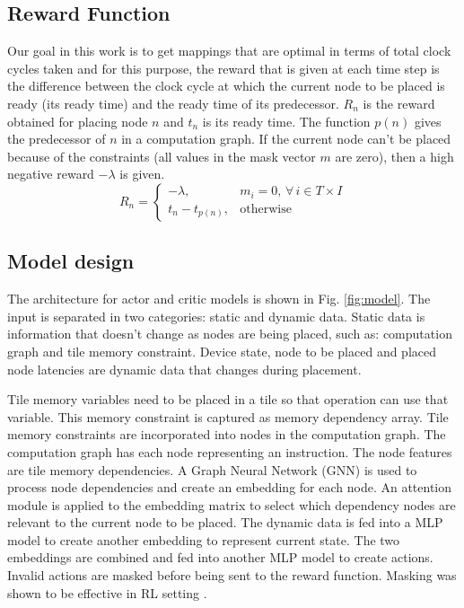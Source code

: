 \subsection{Reward Function}
Our goal in this work is to get mappings that are optimal in terms of total clock cycles taken and for this purpose, the reward that is given at each time step is the difference between the clock cycle at which the current node to be placed is ready (its ready time) and the ready time of its predecessor. 
$R_n$ is the reward obtained for placing node $n$ and $t_n$ is its ready time. 
The function $p(n)$ gives the predecessor of $n$ in a computation graph. 
If the current node can't be placed because of the constraints (all values in the mask vector $m$ are zero), then a high negative reward $-\lambda$ is given.
\[
  R_n =
  \begin{cases}
    -\lambda,& m_i = 0, \, \forall \, i \in T \times I \\
    t_n - t_{p(n)}, & \text{otherwise}
    
  \end{cases}
\]

\subsection{Model design}

The architecture for actor and critic models is shown in Fig. \ref{fig:model}.
The input is separated in two categories: static and dynamic data. 
Static data is information that doesn't change as nodes are being placed, such as: computation graph and tile memory constraint.
Device state, node to be placed and placed node latencies are dynamic data that changes during placement.

Tile memory variables need to be placed in a tile so that operation can use that variable. 
This memory constraint is captured as memory dependency array. 
Tile memory constraints are incorporated into nodes in the computation graph. 
The computation graph has each node representing an instruction. 
The node features are tile memory dependencies. 
A Graph Neural Network (GNN) is used to process node dependencies and create an embedding for each node. 
An attention module is applied to the embedding matrix to select which dependency nodes are relevant to the current node to be placed. The dynamic data is fed into a MLP model to 
create another embedding to represent current state. 
The two embeddings are combined and fed into another MLP model to 
create actions. 
Invalid actions are masked before being sent to the reward function. Masking was shown to be effective in RL setting \cite{Shengyi_mask}.

